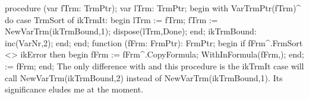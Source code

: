 procedure (var fTrm: TrmPtr);
var
   lTrm: TrmPtr;
begin
  with VarTrmPtr(fTrm)^ do
     case TrmSort of
        ikTrmIt:
           begin
              lTrm := fTrm;
              fTrm := NewVarTrm(ikTrmBound,1);
              dispose(lTrm,Done);
           end;
        ikTrmBound:
           inc(VarNr,2);
     end;
end;
\eatline
{}\nwendcode{}\nwdocspar
\nwenddocs{}\endmoddef\nwstartdeflinemarkup{}\nwenddeflinemarkup
function (fFrm: FrmPtr): FrmPtr;
begin
   if fFrm^.FrmSort <> ikError then
   begin
      fFrm := fFrm^.CopyFormula;
      WithInFormula(fFrm,);
   end;
    := fFrm;
end;
\eatline
{}\nwendcode{}\nwdocspar
The only difference with {\Tt{}\nwendquote} and this procedure is the
{\Tt{}ikTrmIt\nwendquote} case will call {\Tt{}NewVarTrm(ikTrmBound,2)\nwendquote} instead of 
{\Tt{}NewVarTrm(ikTrmBound,1)\nwendquote}. Its significance eludes me at the moment.

